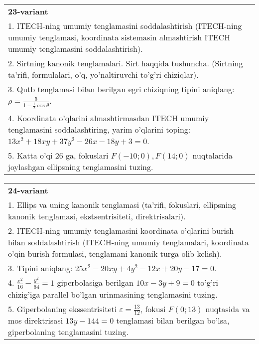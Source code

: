 \documentclass{article}
\begin{document}
\begin{tabular}{m{17cm}}
\textbf{23-variant}\\
1. ITECH-ning umumiy tenglamasini soddalashtirish (ITECH-ning umumiy tenglamasi, koordinata sistemasin almashtirish ITECH umumiy tenglamasini soddalashtirish).\\

2. Sirtning kanonik tenglamalari. Sirt haqqida tushuncha. (Sirtning ta'rifi, formulalari, o'q, yo'naltiruvchi to'g'ri chiziqlar).\\

3. Qutb tenglamasi bilan berilgan egri chiziqning tipini aniqlang: $\rho=\frac{5}{1-\frac{1}{2}\cos\theta}$.\\

4. Koordinata o'qlarini almashtirmasdan ITECH umumiy tenglamasini soddalashtiring, yarim o'qlarini toping: $13x^{2} + 18xy + 37y^{2} - 26x - 18y + 3 = 0$.  \\

5. Katta o'qi 26 ga, fokuslari $F( - 10;0), F(14;0)$ nuqtalarida joylashgan ellipsning tenglamasini tuzing.  
\end{tabular}
\vspace{1cm}


\begin{tabular}{m{17cm}}
\textbf{24-variant}\\
1. Ellips va uning kanonik tenglamasi (ta'rifi, fokuslari, ellipsning kanonik tenglamasi, ekstsentrisiteti, direktrisalari).\\

2. ITECH-ning umumiy tenglamasini koordinata o'qlarini burish bilan soddalashtirish (ITECH-ning umumiy tenglamalari, koordinata o'qin burish formulasi, tenglamani kanonik turga olib kelish).\\

3. Tipini aniqlang: $25x^{2}-20xy+4y^{2}-12x+20y-17=0$.\\

4. $\frac{x^{2}}{16} - \frac{y^{2}}{64} = 1$ giperbolasiga berilgan $10x - 3y + 9 = 0$ to'g'ri chizig'iga parallel bo'lgan urinmasining tenglamasini tuzing.  \\

5. Giperbolaning ekssentrisiteti $\varepsilon = \frac{13}{12}$, fokusi $F(0;13)$ nuqtasida va mos direktrisasi $13y - 144 = 0$ tenglamasi bilan berilgan bo'lsa, giperbolaning tenglamasini tuzing.  
\end{tabular}
\vspace{1cm}
\end{document}
